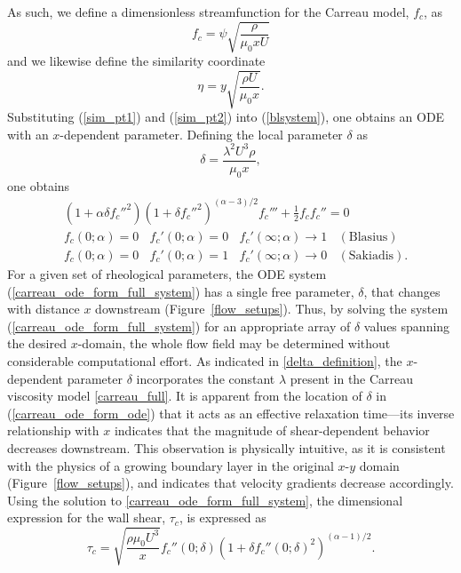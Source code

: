 \documentclass{article}
\begin{document}
As such, we define a dimensionless streamfunction for the Carreau model, $f_c$, as\begin{equation} f_c = \psi \sqrt{\dfrac{\rho}{\mu_0 x U}} \label{sim_pt1}\end{equation} and we likewise define the similarity coordinate \begin{equation} \eta = y \sqrt{\dfrac{\rho U}{\mu_0 x}}. \label{sim_pt2} \end{equation} Substituting (\ref{sim_pt1}) and (\ref{sim_pt2}) into (\ref{blsystem}), one obtains an ODE with an $x$-dependent parameter. Defining the local parameter $\delta$ as \begin{equation}
    \delta = \frac{\lambda^2 U^3 \rho}{\mu_0 x}, \label{delta_definition}
\end{equation}  one obtains \begin{subequations}
    \begin{align}
       & \left(1+\alpha\delta f_c''^2 \right) \left(1+\delta f_c''^2 \right)^{(\alpha-3)/2} f_c''' + \frac{1}{2}f_cf_c'' = 0 \label{carreau_ode_form_ode} \\ &f_c(0; \alpha)=0~~~~f_c'(0; \alpha)=0~~~~f_c'(\infty; \alpha) \to 1 ~~~~ (\mathrm{Blasius})\label{carreau_ode_form_blasius_bcs}  \\
    & f_c(0; \alpha)=0~~~~f_c'(0; \alpha)=1~~~~f_c'(\infty; \alpha) \to 0 ~~~~ (\mathrm{Sakiadis}). \label{carreau_ode_form_sakiadis_bcs} 
    \end{align} \label{carreau_ode_form_full_system} \end{subequations}
\noindent For a given set of rheological parameters, the ODE system (\ref{carreau_ode_form_full_system}) has a single free parameter, $\delta$, that changes with distance $x$ downstream (Figure~\ref{flow_setups}). Thus, by solving the system (\ref{carreau_ode_form_full_system}) for an appropriate array of $\delta$ values spanning the desired $x$-domain, the whole flow field may be determined without considerable computational effort. As indicated in \eqref{delta_definition}, the $x$-dependent parameter $\delta$ incorporates the constant $\lambda$ present in the Carreau viscosity model \eqref{carreau_full}.  It is apparent from the location of $\delta$ in (\ref{carreau_ode_form_ode}) that it acts as an effective relaxation time---its inverse relationship with $x$ indicates that the magnitude of shear-dependent behavior decreases downstream.  This observation is physically intuitive, as it is consistent with the physics of a growing boundary layer in the original $x$-$y$ domain (Figure~\ref{flow_setups}), and indicates that velocity gradients decrease accordingly. Using the solution to \eqref{carreau_ode_form_full_system}, the dimensional expression for the wall shear, $\tau_{c}$, is expressed as \begin{equation}
    \tau_{c} = \sqrt{\dfrac{\rho  \mu_0U^3}{ x}}f_c''\left(0; \delta\right)\left(1 + \delta f_c''\left(0; \delta\right)^2  \right)^{(\alpha-1)/2} .\label{carreau_wall_shear_dimensional_expression}
\end{equation}
\end{document}

